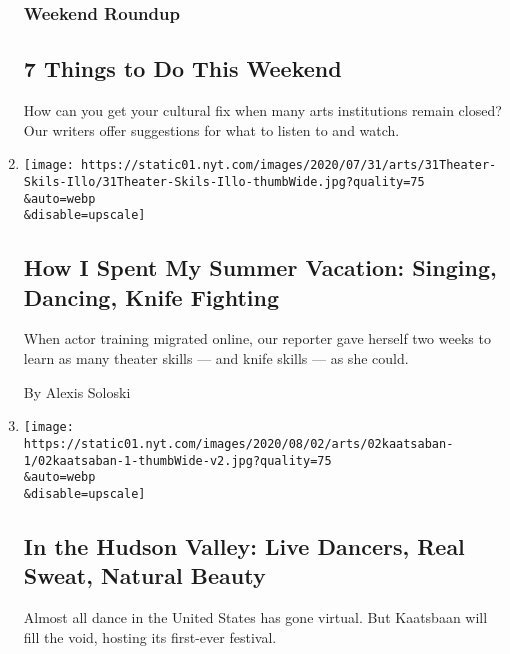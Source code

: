 \begin{enumerate}
  \hypertarget{weekend-roundup}{%
  \subsubsection{Weekend Roundup}\label{weekend-roundup}}

  \hypertarget{7-things-to-do-this-weekend}{%
  \subsection{7 Things to Do This
  Weekend}\label{7-things-to-do-this-weekend}}

  How can you get your cultural fix when many arts institutions remain
  closed? Our writers offer suggestions for what to listen to and watch.
\item
  \href{/2020/07/30/theater/theater-classes-at-home.html}{}

  \texttt{[image: https://static01.nyt.com/images/2020/07/31/arts/31Theater-Skils-Illo/31Theater-Skils-Illo-thumbWide.jpg?quality=75\\\&auto=webp\\\&disable=upscale]}

  \hypertarget{how-i-spent-my-summer-vacation-singing-dancing-knife-fighting}{%
  \subsection{How I Spent My Summer Vacation: Singing, Dancing, Knife
  Fighting}\label{how-i-spent-my-summer-vacation-singing-dancing-knife-fighting}}

  When actor training migrated online, our reporter gave herself two
  weeks to learn as many theater skills --- and knife skills --- as she
  could.

  By Alexis Soloski
\item
  \href{/2020/07/29/arts/dance/kaatsbaan-dance-festival-stella-abrera.html}{}

  \texttt{[image: https://static01.nyt.com/images/2020/08/02/arts/02kaatsaban-1/02kaatsaban-1-thumbWide-v2.jpg?quality=75\\\&auto=webp\\\&disable=upscale]}

  \hypertarget{in-the-hudson-valley-live-dancers-real-sweat-natural-beauty}{%
  \subsection{In the Hudson Valley: Live Dancers, Real Sweat, Natural
  Beauty}\label{in-the-hudson-valley-live-dancers-real-sweat-natural-beauty}}

  Almost all dance in the United States has gone virtual. But Kaatsbaan
  will fill the void, hosting its first-ever festival.


\end{enumerate}
